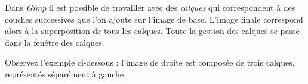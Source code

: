 Dans \emph{Gimp} il est possible de travailler avec des \emph{calques} qui correspondent à des couches successives que l'on ajoute sur l'image de base. L'image finale correspond alors à la superposition de tous les calques. Toute la gestion des calques se passe dans la fenêtre des calques.

\vspace{6pt}

Observez l'exemple ci-dessous : l'image de droite est composée de trois calques, représentés séparément à gauche.

\vspace{16pt}

\begin{minipage}[c]{.22\textwidth}
\centering%
\end{minipage}\hfill%

